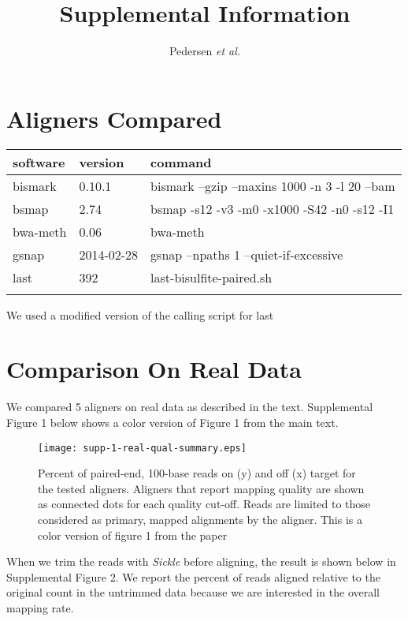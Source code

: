 \documentclass[12pt]{article}
\title{Supplemental Information}
\author{Pedersen \textit{et al.}}
\date{}
\begin{document}
\maketitle

\section{Aligners Compared}

\begin{table}[!t]
{\begin{tabular}{lll}\toprule
software & version & command\\\midrule
bismark & 0.10.1 & bismark --gzip --maxins 1000 -n 3 -l 20 --bam\\
bsmap & 2.74 & bsmap -s12 -v3 -m0 -x1000 -S42 -n0 -s12 -I1\\
bwa-meth & 0.06 & bwa-meth\\
gsnap & 2014-02-28 & gsnap --npaths 1 --quiet-if-excessive\\
last & 392 & last-bisulfite-paired.sh\\\botrule
\end{tabular}}{We used a modified version of the calling script for last}
\end{table}


\section{Comparison On Real Data}

We compared 5 aligners on real data as described in the text. Supplemental
Figure 1 below shows a color version of Figure 1 from the main text.

\begin{figure}[H]%
    \centerline{\texttt{[image: supp-1-real-qual-summary.eps]}}
    \caption{Percent of paired-end, 100-base reads on (y) and off (x) target for the tested aligners. Aligners that report mapping quality are shown as connected dots for each quality cut-off. Reads are limited to those considered as primary, mapped alignments by the aligner. This is a color version of figure 1
from the paper}\label{suppfig:01}
\end{figure}

When we trim the reads with \emph{Sickle} before aligning, the result is shown below in Supplemental Figure 2. We report the percent of reads aligned relative
to the original count in the untrimmed data because we are interested in the
overall mapping rate.
\end{document}
